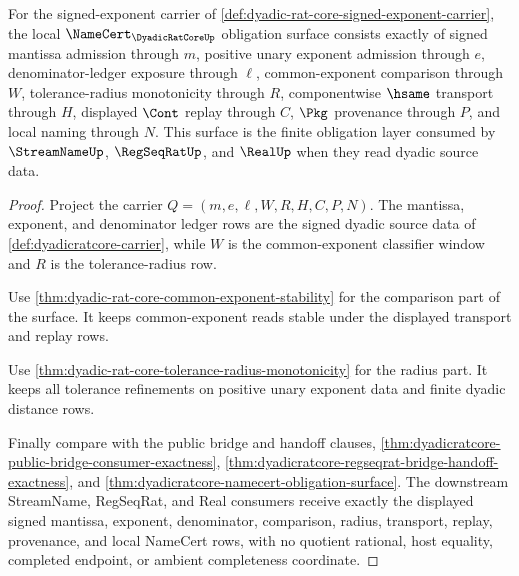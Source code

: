 \begin{theorem}
\label{thm:dyadic-rat-core-namecert-obligation-surface}
For the signed-exponent carrier of \autoref{def:dyadic-rat-core-signed-exponent-carrier}, the local $\NameCert_{\DyadicRatCoreUp}$ obligation surface consists exactly of signed mantissa admission through $m$, positive unary exponent admission through $e$, denominator-ledger exposure through $\ell$, common-exponent comparison through $W$, tolerance-radius monotonicity through $R$, componentwise $\hsame$ transport through $H$, displayed $\Cont$ replay through $C$, $\Pkg$ provenance through $P$, and local naming through $N$. This surface is the finite obligation layer consumed by $\StreamNameUp$, $\RegSeqRatUp$, and $\RealUp$ when they read dyadic source data.
\end{theorem}
\begin{proof}
Project the carrier $Q=(m,e,\ell,W,R,H,C,P,N)$. The mantissa, exponent, and denominator ledger rows are the signed dyadic source data of \autoref{def:dyadicratcore-carrier}, while $W$ is the common-exponent classifier window and $R$ is the tolerance-radius row.

Use \autoref{thm:dyadic-rat-core-common-exponent-stability} for the comparison part of the surface. It keeps common-exponent reads stable under the displayed transport and replay rows.

Use \autoref{thm:dyadic-rat-core-tolerance-radius-monotonicity} for the radius part. It keeps all tolerance refinements on positive unary exponent data and finite dyadic distance rows.

Finally compare with the public bridge and handoff clauses, \autoref{thm:dyadicratcore-public-bridge-consumer-exactness}, \autoref{thm:dyadicratcore-regseqrat-bridge-handoff-exactness}, and \autoref{thm:dyadicratcore-namecert-obligation-surface}. The downstream StreamName, RegSeqRat, and Real consumers receive exactly the displayed signed mantissa, exponent, denominator, comparison, radius, transport, replay, provenance, and local NameCert rows, with no quotient rational, host equality, completed endpoint, or ambient completeness coordinate.
\end{proof}

